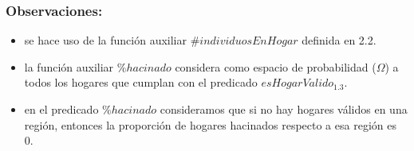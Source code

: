     \subsubsection{Observaciones:}
        \begin{itemize}
            \item se hace uso de la funci\'on auxiliar ${\#}individuosEnHogar$ definida en 2.2.
            \item la funci\'on auxiliar ${\%}hacinado$ considera como espacio de probabilidad ($\Omega$) a todos los hogares que cumplan 
            con el predicado $esHogarValido_{1{.}3}$.
            \item en el predicado $\%hacinado$ consideramos que si no hay hogares v\'alidos en una región, entonces la proporción de hogares hacinados respecto a esa región es 0.
        \end{itemize}